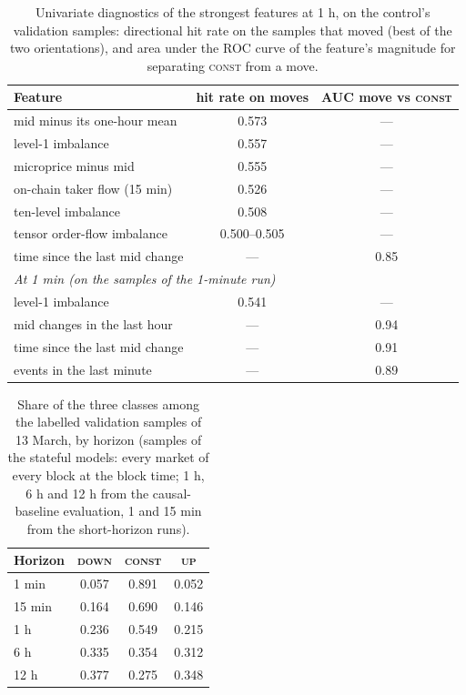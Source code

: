 \begin{table}[h]
\centering
\caption{Univariate diagnostics of the strongest features at 1 h, on the control's
validation samples: directional hit rate on the samples that moved (best of the two
orientations), and area under the ROC curve of the feature's magnitude for separating
\textsc{const} from a move.}
\label{tab:app:univariate}
\small
\begin{fittable}\begin{tabular}{lcc}
\toprule
Feature & hit rate on moves & AUC move vs \textsc{const} \\
\midrule
mid minus its one-hour mean   & 0.573 & --- \\
level-1 imbalance             & 0.557 & --- \\
microprice minus mid          & 0.555 & --- \\
on-chain taker flow (15 min)  & 0.526 & --- \\
ten-level imbalance           & 0.508 & --- \\
tensor order-flow imbalance   & 0.500--0.505 & --- \\
time since the last mid change & --- & 0.85 \\
\midrule
\multicolumn{3}{l}{\emph{At 1 min (on the samples of the 1-minute run)}} \\
level-1 imbalance             & 0.541 & --- \\
mid changes in the last hour  & --- & 0.94 \\
time since the last mid change & --- & 0.91 \\
events in the last minute     & --- & 0.89 \\
\bottomrule
\end{tabular}\end{fittable}
\end{table}



\begin{table}[p]
\centering
\caption{Share of the three classes among the labelled validation samples of 13 March, by
horizon (samples of the stateful models: every market of every block at the block time;
1 h, 6 h and 12 h from the causal-baseline evaluation, 1 and 15 min from the short-horizon
runs).}
\label{tab:expl:classes}
\begin{fittable}\begin{tabular}{lccc}
\toprule
Horizon & \textsc{down} & \textsc{const} & \textsc{up} \\
\midrule
1 min  & 0.057 & 0.891 & 0.052 \\
15 min & 0.164 & 0.690 & 0.146 \\
1 h    & 0.236 & 0.549 & 0.215 \\
6 h    & 0.335 & 0.354 & 0.312 \\
12 h   & 0.377 & 0.275 & 0.348 \\
\bottomrule
\end{tabular}\end{fittable}
\end{table}

